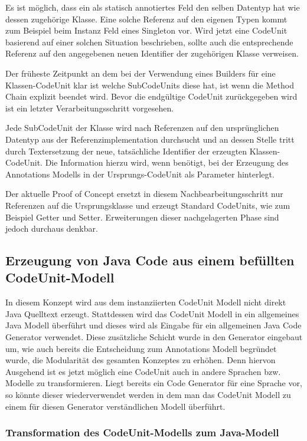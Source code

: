 \documentclass[12pt,oneside,a4paper,parskip]{scrbook}
\begin{document}
Es ist möglich, dass ein als statisch annotiertes Feld den selben Datentyp hat wie dessen zugehörige Klasse. Eine solche Referenz auf den eigenen Typen kommt zum Beispiel beim Instanz Feld eines Singleton vor. Wird jetzt eine CodeUnit basierend auf einer solchen Situation beschrieben, sollte auch die entsprechende Referenz auf den angegebenen neuen Identifier der zugehörigen Klasse verweisen.

Der früheste Zeitpunkt an dem bei der Verwendung eines Builders für eine Klassen-CodeUnit klar ist welche SubCodeUnits diese hat, ist wenn die Method Chain explizit beendet wird. Bevor die endgültige CodeUnit zurückgegeben wird ist ein letzter Verarbeitungsschritt vorgesehen. 

Jede SubCodeUnit der Klasse wird nach Referenzen auf den ursprünglichen Datentyp aus der Referenzimplementation durchsucht und an dessen Stelle tritt durch Textersetzung der neue, tatsächliche Identifier der erzeugten Klassen-CodeUnit. Die Information hierzu wird, wenn benötigt, bei der Erzeugung des Annotations Modells in der Ursprungs-CodeUnit als Parameter hinterlegt.

Der aktuelle Proof of Concept ersetzt in diesem Nachbearbeitungsschritt nur Referenzen auf die Ursprungsklasse und erzeugt Standard CodeUnits, wie zum Beispiel Getter und Setter. Erweiterungen dieser nachgelagerten Phase sind jedoch durchaus denkbar.

\subsection{Erzeugung von Java Code aus einem befüllten CodeUnit-Modell}

In diesem Konzept wird aus dem instanziierten CodeUnit Modell nicht direkt Java Quelltext erzeugt. Stattdessen wird das CodeUnit Modell in ein allgemeines Java Modell überführt und dieses wird als Eingabe für ein allgemeinen Java Code Generator verwendet. Diese zusätzliche Schicht wurde in den Generator eingebaut um, wie auch bereits die Entscheidung zum Annotations Modell begründet wurde, die Modularität des gesamten Konzeptes zu erhöhen. Denn hiervon Ausgehend ist es jetzt möglich eine CodeUnit auch in andere Sprachen  bzw. Modelle zu transformieren. Liegt bereits ein Code Generator für eine Sprache vor, so könnte dieser wiederverwendet werden in dem man das CodeUnit Modell zu einem für diesen Generator verständlichen Modell überführt.

\subsubsection{Transformation des CodeUnit-Modells zum Java-Modell}
\end{document}
